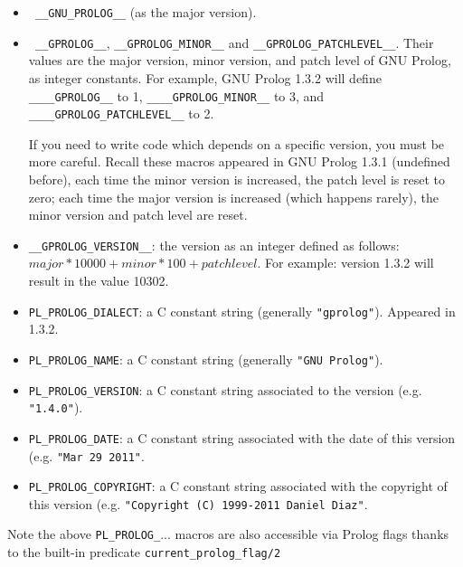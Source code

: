 \begin{itemize}

\item \texttt{ \_\_GNU\_PROLOG\_\_} (as the major version).

\item \texttt{ \_\_GPROLOG\_\_}, \texttt{\_\_GPROLOG\_MINOR\_\_} and
  \texttt{\_\_GPROLOG\_PATCHLEVEL\_\_}. Their values are the major version,
  minor version, and patch level of GNU Prolog, as integer constants. For
  example, GNU Prolog 1.3.2 will define \texttt{\_\_\_\_GPROLOG\_\_} to 1,
  \texttt{\_\_\_\_GPROLOG\_MINOR\_\_} to 3, and
  \texttt{\_\_\_\_GPROLOG\_PATCHLEVEL\_\_} to 2.

  If you need to write code which depends on a specific version, you must be
  more careful. Recall these macros appeared in GNU Prolog 1.3.1 (undefined
  before), each time the minor version is increased, the patch level is reset
  to zero; each time the major version is increased (which happens rarely),
  the minor version and patch level are reset.

\item \texttt{\_\_GPROLOG\_VERSION\_\_}: the version as an integer defined as
  follows: $major * 10000 + minor * 100 + patch level$. For example: version
  1.3.2 will result in the value 10302.

\item \texttt{PL\_PROLOG\_DIALECT}: a C constant string (generally
  \texttt{"gprolog"}). Appeared in 1.3.2.

\item \texttt{PL\_PROLOG\_NAME}: a C constant string (generally
  \texttt{"GNU Prolog"}).

\item \texttt{PL\_PROLOG\_VERSION}: a C constant string associated to the
  version (e.g. \texttt{"1.4.0"}).

\item \texttt{PL\_PROLOG\_DATE}: a C constant string associated with the date
  of this version (e.g. \texttt{"Mar 29 2011"}.

\item \texttt{PL\_PROLOG\_COPYRIGHT}: a C constant string associated with the
  copyright of this version (e.g. \texttt{"Copyright (C) 1999-2011 Daniel Diaz"}.

\end{itemize}

Note the above \texttt{PL\_PROLOG\_}... macros are also accessible via Prolog
flags thanks to the built-in predicate \texttt{current\_prolog\_flag/2}


